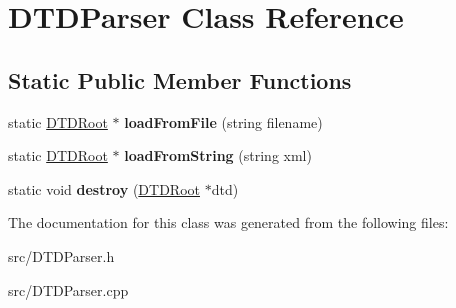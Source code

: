 \hypertarget{class_d_t_d_parser}{\section{\-D\-T\-D\-Parser \-Class \-Reference}
\label{class_d_t_d_parser}
}
\subsection*{\-Static \-Public \-Member \-Functions}
\begin{DoxyCompactItemize}
\item 
\hypertarget{class_d_t_d_parser_a482a9f85780d4b3d323bd6fe8d12eb9a}{static \hyperlink{class_d_t_d_root}{\-D\-T\-D\-Root} $\ast$ {\bfseries load\-From\-File} (string filename)}\label{class_d_t_d_parser_a482a9f85780d4b3d323bd6fe8d12eb9a}

\item 
\hypertarget{class_d_t_d_parser_a682f5def4a03eb22af5f8805e7ca17f5}{static \hyperlink{class_d_t_d_root}{\-D\-T\-D\-Root} $\ast$ {\bfseries load\-From\-String} (string xml)}\label{class_d_t_d_parser_a682f5def4a03eb22af5f8805e7ca17f5}

\item 
\hypertarget{class_d_t_d_parser_a235b09822b2a4b709ba2e6f67714930f}{static void {\bfseries destroy} (\hyperlink{class_d_t_d_root}{\-D\-T\-D\-Root} $\ast$dtd)}\label{class_d_t_d_parser_a235b09822b2a4b709ba2e6f67714930f}

\end{DoxyCompactItemize}


\-The documentation for this class was generated from the following files\-:\begin{DoxyCompactItemize}
\item 
src/\-D\-T\-D\-Parser.\-h\item 
src/\-D\-T\-D\-Parser.\-cpp\end{DoxyCompactItemize}
